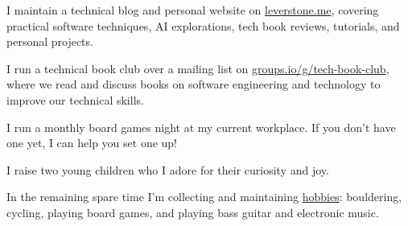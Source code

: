 \documentclass[11pt, a4paper]{awesome-cv}
\begin{document}
\begin{cvparagraph}
  \begin{cvitems}
    \item {I maintain a technical blog and personal website on \href{https://leverstone.me}{leverstone.me}, covering practical software techniques, AI explorations, tech book reviews, tutorials, and personal projects.}
    \item {I run a technical book club over a mailing list on \href{https://groups.io/g/tech-book-club}{groups.io/g/tech-book-club}, where we read and discuss books on software engineering and technology to improve our technical skills.}
    \item {I run a monthly board games night at my current workplace. If you don't have one yet, I can help you set one up!}
    \item {I raise two young children who I adore for their curiosity and joy.}
    \item {In the remaining spare time I'm collecting and maintaining \href{https://leverstone.me/hobbies}{hobbies}: bouldering, cycling, playing board games, and playing bass guitar and electronic music.}
  \end{cvitems}
\end{cvparagraph}

\end{document}

